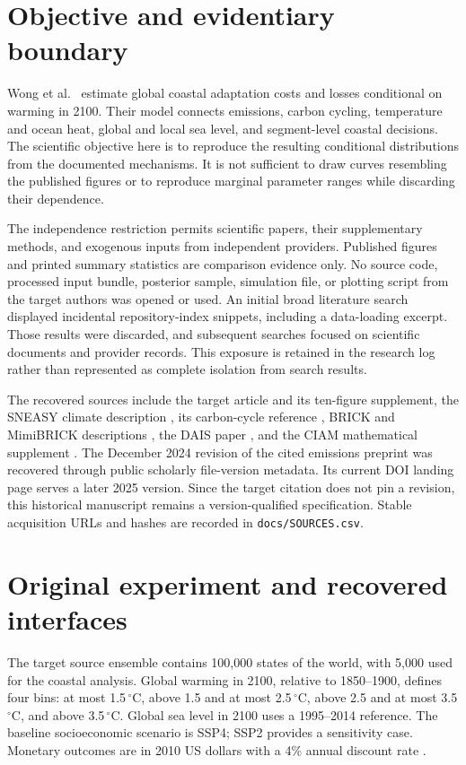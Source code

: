 \documentclass[11pt]{article}
\begin{document}
\section{Objective and evidentiary boundary}

Wong et al.\ \cite{wong2025} estimate global coastal adaptation costs and losses
conditional on warming in 2100. Their model connects emissions, carbon cycling,
temperature and ocean heat, global and local sea level, and segment-level coastal
decisions. The scientific objective here is to reproduce the resulting
conditional distributions from the documented mechanisms. It is not sufficient
to draw curves resembling the published figures or to reproduce marginal
parameter ranges while discarding their dependence.

The independence restriction permits scientific papers, their supplementary
methods, and exogenous inputs from independent providers. Published figures and
printed summary statistics are comparison evidence only. No source code,
processed input bundle, posterior sample, simulation file, or plotting script
from the target authors was opened or used. An initial broad literature search
displayed incidental repository-index snippets, including a data-loading
excerpt. Those results were discarded, and subsequent searches focused on
scientific documents and provider records. This exposure is retained in the
research log rather than represented as complete isolation from search results.

The recovered sources include the target article and its ten-figure supplement,
the SNEASY climate description \cite{urban}, its carbon-cycle reference
\cite{ricciuto}, BRICK and MimiBRICK descriptions \cite{brick,joss}, the DAIS
paper \cite{shaffer}, and the CIAM mathematical supplement \cite{diaz}.
The December 2024 revision of the cited emissions preprint \cite{darnell} was
recovered through public scholarly file-version metadata. Its current DOI
landing page serves a later 2025 version. Since the target citation does not pin
a revision, this historical manuscript remains a version-qualified specification.
Stable acquisition URLs and hashes are recorded in \texttt{docs/SOURCES.csv}.

\section{Original experiment and recovered interfaces}

The target source ensemble contains 100,000 states of the world, with 5,000 used
for the coastal analysis. Global warming in 2100, relative to 1850--1900, defines
four bins: at most 1.5\,$^\circ$C, above 1.5 and at most 2.5\,$^\circ$C, above 2.5 and
at most 3.5\,$^\circ$C, and above 3.5\,$^\circ$C. Global sea level in 2100 uses a
1995--2014 reference. The baseline socioeconomic scenario is SSP4; SSP2 provides
a sensitivity case. Monetary outcomes are in 2010 US dollars with a 4\% annual
discount rate \cite{wong2025}.
\end{document}
